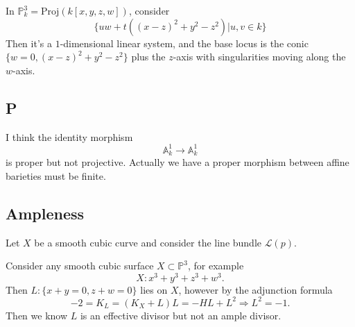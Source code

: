 \documentclass[../main.tex]{subfiles}
\begin{document}
\begin{example}
In $\mathbb{P}_{k}^{3}=\mathrm{Proj}(k[x,y,z,w])$, consider 
$$\{uw+t((x-z)^{2}+y^{2}-z^{2})|u,v\in k\}$$
Then it's a $1$-dimensional linear system, and the base locus is the conic $\{w=0, (x-z)^{2}+y^{2}-z^{2}\}$ plus the $z$-axis with singularities moving along the $w$-axis.





\subsection{P}
\begin{example}
I think the identity morphism 
$$\mathbb{A}_{k}^{1}\rightarrow \mathbb{A}_{k}^{1}$$
is proper but not projective. Actually we have a proper morphism between affine barieties must be finite.
\end{example}






\end{example}

\subsection{Ampleness}

\begin{example}
Let $X$ be a smooth cubic curve and consider the line bundle $\mathscr{L}(p)$.
\end{example}

\begin{example}
\end{example}

\begin{example}
Consider any smooth cubic surface  $X\subset \mathbb{P}^{3}$, for example
$$X:x^{3}+y^{3}+z^{3}+w^{3}.$$
Then $L:\{x+y=0, z+w=0\}$ lies on $X$, however by the adjunction formula
$$-2=K_{L}=(K_{X}+L)L=-HL+L^{2}\Rightarrow L^{2}=-1.$$
Then we know $L$ is an effective divisor but not an ample divisor.
\end{example}
\end{document}
